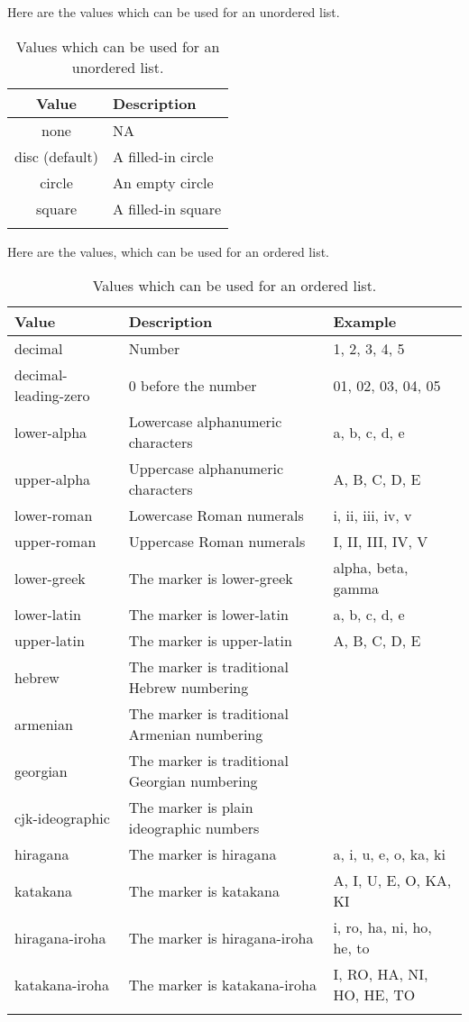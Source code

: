 \documentclass[a4paper,oneside]{book}
\numberwithin{equation}{chapter}
\begin{document}
Here are the values which can be used for an unordered list.
\begin{center}
\begin{longtable}{|c|l|}
\hline
\textbf{Value} & \textbf{Description}\\
\hline
none & NA\\
\hline
disc (default) & A filled-in circle\\
\hline
circle & An empty circle\\
\hline
square & A filled-in square\\
\hline
\caption{Values which can be used for an unordered list.}
\end{longtable}
\end{center}
Here are the values, which can be used for an ordered list.
\begin{center}
\begin{longtable}{|l|p{5cm}|p{3cm}|}
\hline
\textbf{Value} & \textbf{Description} & \textbf{Example}\\
\hline
decimal & Number & 1, 2, 3, 4, 5\\
\hline
decimal-leading-zero & 0 before the number & 01, 02, 03, 04, 05\\
\hline
lower-alpha & Lowercase alphanumeric characters & a, b, c, d, e\\
\hline
upper-alpha & Uppercase alphanumeric characters & A, B, C, D, E\\
\hline
lower-roman &	Lowercase Roman numerals &	i, ii, iii, iv, v\\
\hline
upper-roman &	Uppercase Roman numerals &	I, II, III, IV, V\\
\hline
lower-greek &	The marker is lower-greek &	alpha, beta, gamma\\
\hline
lower-latin &	The marker is lower-latin &	a, b, c, d, e\\
\hline
upper-latin &	The marker is upper-latin &	A, B, C, D, E\\
\hline
hebrew &	The marker is traditional Hebrew numbering &\\
\hline 	 
armenian &	The marker is traditional Armenian numbering & \\
\hline 	 
georgian &	The marker is traditional Georgian numbering & \\
\hline 	 
cjk-ideographic &	The marker is plain ideographic numbers & \\
\hline
hiragana &	The marker is hiragana 	& a, i, u, e, o, ka, ki\\
\hline
katakana & The marker is katakana &	A, I, U, E, O, KA, KI\\
\hline
hiragana-iroha &	The marker is hiragana-iroha &	i, ro, ha, ni, ho, he, to\\
\hline
katakana-iroha &	The marker is katakana-iroha &	I, RO, HA, NI, HO, HE, TO\\
\hline
\caption{Values which can be used for an ordered list.}
\end{longtable}
\end{center}
\end{document}
